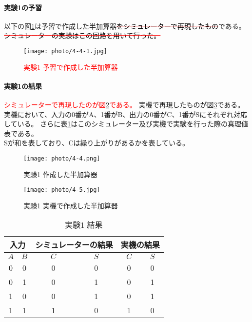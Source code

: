 \documentclass[dvipdfmx]{jsarticle}
\newcommand{\Add}[1]{\textcolor{red}{#1}}
\newcommand{\Erase}[1]{\textcolor{red}{\sout{\textcolor{black}{#1}}}}
\begin{document}
\paragraph{実験1の予習}
以下の図\ref*{fig:4-4-1}は予習で作成した半加算器\Erase{をシミュレーターで再現したもの}である。\\
\Erase{シミュレーターの実験はこの回路を用いて行った。}

\begin{figure}[hbtp]
  \begin{center}
    \texttt{[image: photo/4-4-1.jpg]}
  \end{center}
  \caption{\Add{実験1 予習で作成した半加算器}}
  \label{fig:4-4-1}
\end{figure}

\paragraph{実験1の結果}
\Add{シミュレーターで再現したのが図\ref*{fig:4-4}である。}
実機で再現したものが図\ref*{fig:4-5}である。
実機において、入力の0番がA、1番がB、出力の0番がC、1番がSにそれぞれ対応している。
さらに表\ref*{tb:4-3}はこのシミュレーター及び実機で実験を行った際の真理値表である。\\
Sが和を表しており、Cは繰り上がりがあるかを表している。

\begin{figure}[h]
  \begin{center}
    \texttt{[image: photo/4-4.png]}
  \end{center}
  \caption{実験1 作成した半加算器}
  \label{fig:4-4}
\end{figure}

\begin{figure}[h]
  \begin{center}
    \texttt{[image: photo/4-5.jpg]}
  \end{center}
  \caption{実験1 実機で作成した半加算器}
  \label{fig:4-5}
\end{figure}

\begin{table}[h]
  \caption{実験1 結果}
  \centering
  \begin{tabular}{|c|c||c|c||c|c|} \hline
    \multicolumn{2}{|c||}{入力} & \multicolumn{2}{c||}{シミュレーターの結果} & \multicolumn{2}{c|}{実機の結果} \\ \hline
    $A$ & $B$ & $C$ & $S$ & $C$ & $S$\\ \hline
    0 & 0 & 0 & 0 & 0 & 0\\ \hline
    0 & 1 & 0 & 1 & 0 & 1\\ \hline
    1 & 0 & 0 & 1 & 0 & 1\\ \hline
    1 & 1 & 1 & 0 & 1 & 0\\ \hline
  \end{tabular}
  \label{tb:4-3}
\end{table}
\end{document}
